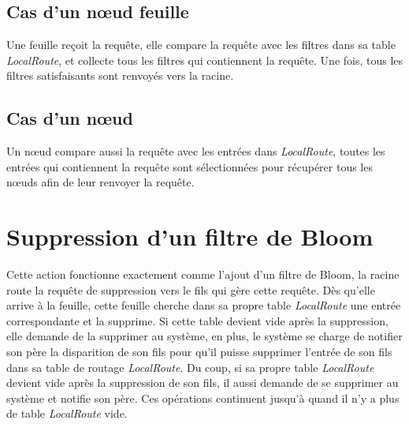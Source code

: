\documentclass[a4paper,11pt]{report}
\begin{document}
\subsection{Cas d'un nœud feuille}
	Une feuille reçoit la requête, elle compare la requête avec les filtres dans sa table \textit{LocalRoute}, et collecte tous les filtres qui contiennent la requête. Une fois, tous les filtres satisfaisants sont renvoyés vers la racine.

\subsection{Cas d'un nœud}
	Un nœud compare aussi la requête avec les entrées dans \textit{LocalRoute}, toutes les entrées qui contiennent la requête sont sélectionnées pour récupérer tous les nœuds afin de leur renvoyer la requête.
	
\section{Suppression d'un filtre de Bloom}
	Cette action fonctionne exactement comme l'ajout d'un filtre de Bloom, la racine route la requête de suppression vers le fils qui gère cette requête. Dès qu'elle arrive à la feuille, cette feuille cherche dans sa propre table \textit{LocalRoute} une entrée correspondante et la supprime. Si cette table devient vide après la suppression, elle demande de la supprimer au système, en plus, le système se charge de notifier son père la disparition de son fils pour qu'il puisse supprimer l'entrée de son fils dans sa table de routage \textit{LocalRoute}. Du coup, si sa propre table \textit{LocalRoute} devient vide après la suppression de son fils, il aussi demande de se supprimer au système et notifie son père. Ces opérations continuent jusqu'à quand il n'y a plus de table \textit{LocalRoute} vide.
\end{document}
